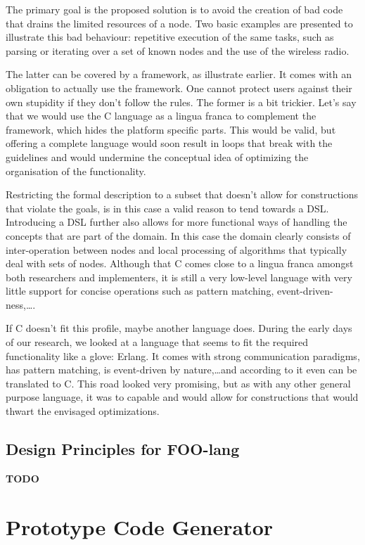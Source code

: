 \documentclass[conference]{IEEEtran}
\newcommand{\TODO}{\textbf{\color{red}TODO}}
\begin{document}
The primary goal is the proposed solution is to avoid the creation of bad code
that drains the limited resources of a node. Two basic examples are presented
to illustrate this bad behaviour: repetitive execution of the same tasks, such
as parsing or iterating over a set of known nodes and the use of the wireless
radio.

The latter can be covered by a framework, as illustrate earlier. It comes with
an obligation to actually use the framework. One cannot protect users against
their own stupidity if they don't follow the rules. The former is a bit
trickier. Let's say that we would use the C language as a lingua franca to
complement the framework, which hides the platform specific parts. This would
be valid, but offering a complete language would soon result in loops that
break with the guidelines and would undermine the conceptual idea of optimizing
the organisation of the functionality.

Restricting the formal description to a subset that doesn't allow for
constructions that violate the goals, is in this case a valid reason to tend
towards a DSL. Introducing a DSL further also allows for more functional ways
of handling the concepts that are part of the domain. In this case the domain
clearly consists of inter-operation between nodes and local processing of
algorithms that typically deal with sets of nodes. Although that C comes close
to a lingua franca amongst both researchers and implementers, it is still a
very low-level language with very little support for concise operations such as
pattern matching, event-driven-ness,\dots.

If C doesn't fit this profile, maybe another language does. During the early
days of our research, we looked at a language that seems to fit the required
functionality like a glove: Erlang. It comes with strong communication
paradigms, has pattern matching, is event-driven by nature,\dots and according
to \cite{wong1998compiling} it even can be translated to C. This road looked
very promising, but as with any other general purpose language, it was to
capable and would allow for constructions that would thwart the envisaged
optimizations.

\subsection{Design Principles for FOO-lang}
\label{subsection:design}

\TODO

\section{Prototype Code Generator}
\label{section:prototype}
\end{document}
